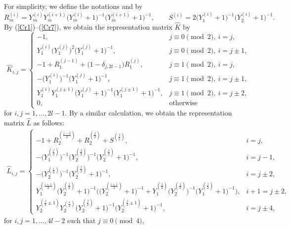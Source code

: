 \documentclass[10pt,a4paper]{amsart}
\numberwithin{equation}{section}
\begin{document}
For simplicity, we define the notations  and  by
	\[R_m^{(i)}=Y_m^{(i)}Y_m^{(i+1)}\bigl(Y_m^{(i)}+1\bigr)^{-1}\bigl(Y_m^{(i+1)}+1\bigr)^{-1},\qquad S^{(i)}=2\bigl(Y_1^{(i)}+1\bigr)^{-1}\bigl(Y_2^{(i)}+1\bigr)^{-1}.\]
By (\ref{Cr1})--(\ref{Cr7}), we obtain the representation matrix $\hat{K}$ by
	\[\hat{K}_{i,j}=\begin{cases}
		-1,& j\equiv0\pmod{2},\ i=j, \\
		Y_1^{(i)}\bigl(Y_1^{(j)}\bigr)^2\bigl(Y_1^{(j)}+1\bigr)^{-1},& j\equiv0\pmod{2},\ i=j\pm1, \\
		-1+R_1^{(j-1)}+\bigl(1-\delta_{j,2l-1}\bigr)R_1^{(j)},& j\equiv1\pmod{2},\ i=j, \\
		-\bigl(Y_1^{(i)}\bigr)^{-1}\bigl(Y_1^{(j)}+1\bigr)^{-1},& j\equiv1\pmod{2},\ i=j\pm1, \\
		Y_1^{(i)}Y_1^{(j\pm1)}\bigl(Y_1^{(j)}+1\bigr)^{-1}\bigl(Y_1^{(j\pm1)}+1\bigr)^{-1},& j\equiv1\pmod{2},\ i=j\pm2,\\
		0,& \text{otherwise}
	\end{cases}\]
for $i,j=1,\dots,2l-1$.
By a similar calculation, we obtain the representation matrix $\hat{L}$ as follows:
	\begin{gather*}
 \hat{L}_{i,j}=\begin{cases}
		-1+R_2^{(\frac{j-2}{2})}+R_2^{(\frac{j}{2})}+S^{(\frac{j}{2})},& i=j,\\
		-\bigl(Y_1^{(\frac{j}{2})}\bigr)^{-1}\bigl(Y_2^{(\frac{j}{2})}\bigr)^{-1}\bigl(Y_2^{(\frac{j}{2})}+1\bigr)^{-1},& i=j-1,\\
		-\bigl(Y_2^{(\frac{i}{2})}\bigr)^{-1}\bigl(Y_2^{(\frac{j}{2})}+1\bigr)^{-1},& i=j\pm2,\\ Y_1^{(\frac{i+1}{2})}\bigl(Y_2^{(\frac{j}{2})}\!+1\bigr)^{-1}\bigl(\bigl(Y_2^{(\frac{i+1}{2})}\!+1\bigr)^{-1}+ Y_1^{(\frac{j}{2})}\bigl(Y_2^{(\frac{j}{2})}\bigr)^{-1}\bigl(Y_1^{(\frac{j}{2})}\!+1\bigr)^{-1}\bigr),\!& i+1=j\pm2,\\
		Y_2^{(\frac{j}{2}\pm1)}Y_2^{(\frac{i}{2})}\bigl(Y_2^{(\frac{j}{2})}+1\bigr)^{-1}\bigl(Y_2^{(\frac{j}{2}\pm1)}+1\bigr)^{-1},& i=j\pm4,
	\end{cases}
 \end{gather*}
for $i,j=1,\dots,4l-2$ such that $j\equiv0\pmod{4}$,
\end{document}

